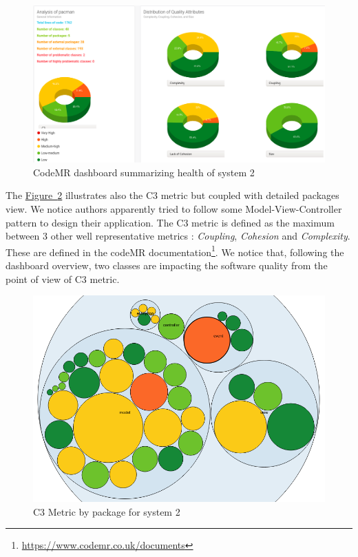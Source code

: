 \documentclass[]{article}
\newcommand{\wordlink}[2]{\hyperref[#2]{#1~\ref{#2}}}
\begin{document}
\begin{figure}[h]
\includegraphics[width=\linewidth]{S2-codeMR_dashboard}
\caption{CodeMR dashboard summarizing health of system 2}
\label{fig:S2_codeMR_dashboard}
\end{figure}

\newpage

The \wordlink{Figure}{fig:S2_codeMR_packages} illustrates also the C3 metric but coupled with detailed packages view. We notice authors apparently tried to follow some Model-View-Controller pattern to design their application. The C3 metric is defined as the maximum between 3 other well representative metrics : \textit{Coupling}, \textit{Cohesion} and \textit{Complexity}. These are defined in the codeMR documentation\footnote{\url{https://www.codemr.co.uk/documents}}. We notice that, following the dashboard overview, two classes are impacting the software quality from the point of view of C3 metric.
\vspace{0.2cm}
\begin{figure}[h]
\centering
\includegraphics[width=0.8\linewidth]{S2-codeMR_packages}
\caption{C3 Metric by package for system 2}
\label{fig:S2_codeMR_packages}
\end{figure}
\end{document}

